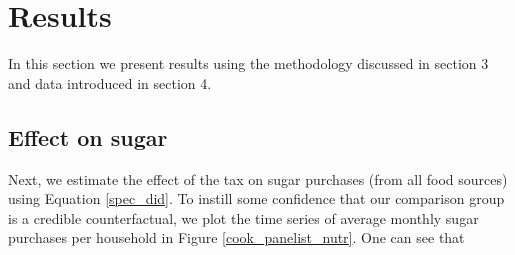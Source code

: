 \documentclass[12pt]{article}
\begin{document}

\section{Results} \label{results}
In this section we present results using the methodology discussed in section 3 and data introduced in section 4.

%
%
%

\subsection{Effect on sugar}

Next, we estimate the effect of the tax on sugar purchases (from all food sources) using Equation \ref{spec_did}. To instill some confidence that our comparison group is a credible counterfactual, we plot the time series of average monthly sugar purchases per household in Figure \ref{cook_panelist_nutr}. One can see that %
\end{document}
